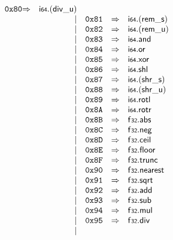 $$\begin{array}{@{}l@{}rrlll@{}l@{}}
\mathtt{0x80} &\Rightarrow& \mathsf{i{\scriptstyle64}} . ({\mathsf{div\_}}{\mathsf{u}}) \\ &&|&
\mathtt{0x81} &\Rightarrow& \mathsf{i{\scriptstyle64}} . ({\mathsf{rem\_}}{\mathsf{s}}) \\ &&|&
\mathtt{0x82} &\Rightarrow& \mathsf{i{\scriptstyle64}} . ({\mathsf{rem\_}}{\mathsf{u}}) \\ &&|&
\mathtt{0x83} &\Rightarrow& \mathsf{i{\scriptstyle64}} . \mathsf{and} \\ &&|&
\mathtt{0x84} &\Rightarrow& \mathsf{i{\scriptstyle64}} . \mathsf{or} \\ &&|&
\mathtt{0x85} &\Rightarrow& \mathsf{i{\scriptstyle64}} . \mathsf{xor} \\ &&|&
\mathtt{0x86} &\Rightarrow& \mathsf{i{\scriptstyle64}} . \mathsf{shl} \\ &&|&
\mathtt{0x87} &\Rightarrow& \mathsf{i{\scriptstyle64}} . ({\mathsf{shr\_}}{\mathsf{s}}) \\ &&|&
\mathtt{0x88} &\Rightarrow& \mathsf{i{\scriptstyle64}} . ({\mathsf{shr\_}}{\mathsf{u}}) \\ &&|&
\mathtt{0x89} &\Rightarrow& \mathsf{i{\scriptstyle64}} . \mathsf{rotl} \\ &&|&
\mathtt{0x8A} &\Rightarrow& \mathsf{i{\scriptstyle64}} . \mathsf{rotr} \\ &&|&
\mathtt{0x8B} &\Rightarrow& \mathsf{f{\scriptstyle32}} . \mathsf{abs} \\ &&|&
\mathtt{0x8C} &\Rightarrow& \mathsf{f{\scriptstyle32}} . \mathsf{neg} \\ &&|&
\mathtt{0x8D} &\Rightarrow& \mathsf{f{\scriptstyle32}} . \mathsf{ceil} \\ &&|&
\mathtt{0x8E} &\Rightarrow& \mathsf{f{\scriptstyle32}} . \mathsf{floor} \\ &&|&
\mathtt{0x8F} &\Rightarrow& \mathsf{f{\scriptstyle32}} . \mathsf{trunc} \\ &&|&
\mathtt{0x90} &\Rightarrow& \mathsf{f{\scriptstyle32}} . \mathsf{nearest} \\ &&|&
\mathtt{0x91} &\Rightarrow& \mathsf{f{\scriptstyle32}} . \mathsf{sqrt} \\ &&|&
\mathtt{0x92} &\Rightarrow& \mathsf{f{\scriptstyle32}} . \mathsf{add} \\ &&|&
\mathtt{0x93} &\Rightarrow& \mathsf{f{\scriptstyle32}} . \mathsf{sub} \\ &&|&
\mathtt{0x94} &\Rightarrow& \mathsf{f{\scriptstyle32}} . \mathsf{mul} \\ &&|&
\mathtt{0x95} &\Rightarrow& \mathsf{f{\scriptstyle32}} . \mathsf{div} \\ &&|&

\end{array}$$

